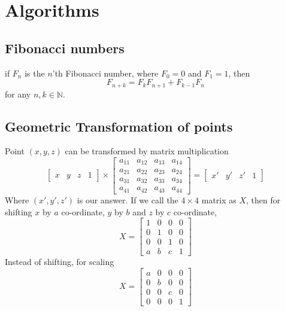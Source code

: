 \documentclass[8pt, a4paper, twocolumn]{article}
\begin{document}
\section{Algorithms}

\subsection{Fibonacci numbers}
if $F_n$ is the $n$'th Fibonacci number, where $F_0=0$ and $F_1=1$, then
$$F_{n+k}=F_kF_{n+1}+F_{k-1}F_n$$
for any $n,k\in\mathbb{N}$.

\subsection{Geometric Transformation of points}
Point $(x,y,z)$ can be transformed by matrix multiplication 
\begin{equation*}
\begin{bmatrix}
x & y & z & 1
\end{bmatrix}\times\begin{bmatrix}
a_{11} & a_{12} & a_{13} & a_{14}\\
a_{21} & a_{22} & a_{23} & a_{24}\\
a_{31} & a_{32} & a_{33} & a_{34}\\
a_{41} & a_{42} & a_{43} & a_{44}
\end{bmatrix}=\begin{bmatrix}
x' & y' & z' & 1
\end{bmatrix}
\end{equation*}
Where $(x',y',z')$ is our answer. If we call the $4\times4$ matrix as $X$, then for shifting $x$ by $a$ co-ordinate, $y$ by $b$ and $z$ by $c$ co-ordinate,
\begin{equation*}
X=\begin{bmatrix}
1 & 0 & 0 & 0\\
0 & 1 & 0 & 0\\
0 & 0 & 1 & 0\\
a & b & c & 1
\end{bmatrix}
\end{equation*}
Instead of shifting, for scaling
\begin{equation*}
X=\begin{bmatrix}
a & 0 & 0 & 0\\
0 & b & 0 & 0\\
0 & 0 & c & 0\\
0 & 0 & 0 & 1
\end{bmatrix}
\end{equation*}
\end{document}
